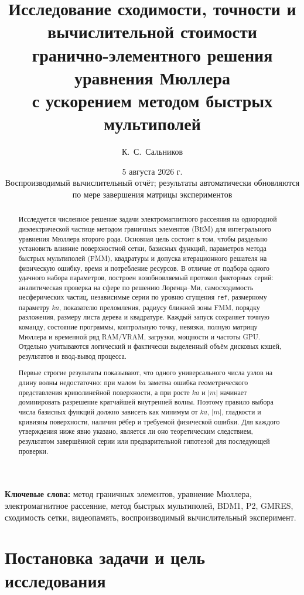 \documentclass[12pt,a4paper]{article}
\title{%
  Исследование сходимости, точности и вычислительной стоимости\\
  гранично-элементного решения уравнения Мюллера\\
  с ускорением методом быстрых мультиполей}
\author{К.~С.~Сальников}
\date{5 августа 2026 г.\\[4pt]
\small Воспроизводимый вычислительный отчёт; результаты автоматически обновляются по мере завершения матрицы экспериментов}
\begin{document}
\maketitle

\begin{abstract}
Исследуется численное решение задачи электромагнитного рассеяния на однородной
диэлектрической частице методом граничных элементов (BEM) для интегрального
уравнения Мюллера второго рода. Основная цель состоит в том, чтобы раздельно
установить влияние поверхностной сетки, базисных функций, параметров метода
быстрых мультиполей (FMM), квадратуры и допуска итерационного решателя на
физическую ошибку, время и потребление ресурсов. В отличие от подбора одного
удачного набора параметров, построен возобновляемый протокол факторных серий:
аналитическая проверка на сфере по решению Лоренца--Ми, самосходимость
несферических частиц, независимые серии по уровню сгущения \texttt{ref},
размерному параметру $ka$, показателю преломления, радиусу ближней зоны FMM,
порядку разложения, размеру листа дерева и квадратуре. Каждый запуск сохраняет
точную команду, состояние программы, контрольную точку, невязки, полную матрицу
Мюллера и временной ряд RAM/VRAM, загрузки, мощности и частоты GPU.
Отдельно учитываются логический и фактически выделенный объём дисковых кэшей,
результатов и ввод-вывод процесса.

Первые строгие результаты показывают, что одного универсального числа узлов на
длину волны недостаточно: при малом $ka$ заметна ошибка геометрического
представления криволинейной поверхности, а при росте $ka$ и $|m|$ начинает
доминировать разрешение кратчайшей внутренней волны. Поэтому правило выбора
числа базисных функций должно зависеть как минимум от $ka$, $|m|$, гладкости и
кривизны поверхности, наличия рёбер и требуемой физической ошибки. Для каждого
утверждения ниже явно указано, является ли оно теоретическим следствием,
результатом завершённой серии или предварительной гипотезой для последующей
проверки.
\end{abstract}

\noindent\textbf{Ключевые слова:} метод граничных элементов, уравнение
Мюллера, электромагнитное рассеяние, метод быстрых мультиполей, BDM1, P2,
GMRES, сходимость сетки, видеопамять, воспроизводимый вычислительный эксперимент.

\tableofcontents

\section{Постановка задачи и цель исследования}
\end{document}
